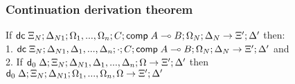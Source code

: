 \subsubsection{Continuation derivation theorem}

If $\mathsf{dc} \; \Xi_N; \Delta_{N1}; \Omega_1, ..., \Omega_n; C; \mathsf{comp} \; A \multimap B; \Omega_N; \Delta_N \rightarrow \Xi'; \Delta'$ then:\\
1. \hspace{1cm} $\mathsf{dc} \; \Xi_N; \Delta_{N1}, \Delta_1, ..., \Delta_n; \cdot; C; \mathsf{comp} \; A \multimap B; \Omega_N; \Delta_N \rightarrow \Xi'; \Delta'$ and \\
2. \hspace{1cm} If $\mathsf{d}_0 \; \Delta; \Xi_N; \Delta_{N1}, \Delta_1, ..., \Delta_n; \Omega \rightarrow \Xi'; \Delta'$ then $\mathsf{d}_0 \; \Delta; \Xi_N; \Delta_{N1}; \Omega_1, ..., \Omega_n, \Omega \rightarrow \Xi'; \Delta'$

